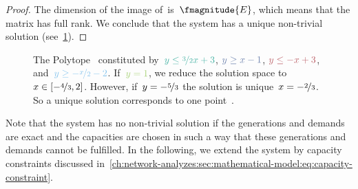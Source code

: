 \begin{proof}
% 
The dimension of the image of~\constraintmatrix is~$\fmagnitude{\edges}$, which
means that the matrix has full rank. We conclude that the system has a unique
non-trivial solution (see~\cref{ch:network-analyzes:fig:polytope-simple-example}).
% 
\end{proof}
%
% 
\begin{figure}%
    \vspace{-0.6cm}
    \caption[A simple polytope example.]{The \textcolor{orange!60}
    {Polytope~\polyhedron} constituted by~$
     \textcolor{KITgreen70}{y \leq \nicefrac{3}{2} x + 3}$,
    $\textcolor{KITseablue70}{y \geq x - 1}$, 
    $\textcolor{KITred70}{y \leq -x + 3}$, and~$
     \textcolor{KITcyanblue70}{y \geq -\nicefrac{x}{2} - 2}$. 
    If~$\textcolor{KITpalegreen70}{y = 1}$, we reduce the solution space
    to~$x\in[-\nicefrac{4}{3}, 2]$. However, if~$y = -\nicefrac{5}{3}$ the
    solution is unique~$x = -\nicefrac{2}{3}$. So a unique solution corresponds
    to one point~\tikzPolytopePoint.
    }%
    \vspace{-0.4cm}
    \label{ch:network-analyzes:fig:polytope-simple-example}%
\end{figure}%
%  
Note that the system has no non-trivial solution if the generations and demands
are exact and the capacities are chosen in such a way that these generations and
demands cannot be fulfilled. In the following, we extend the system by capacity
constraints discussed
in~\cref{ch:network-analyzes:sec:mathematical-model:eq:capacity-constraint}.%
% 

